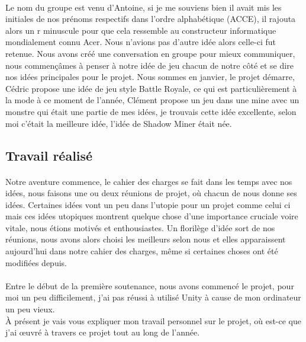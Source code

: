 \documentclass[titlepage, 13px, a4paper]{report}
\begin{document}
\paragraph{} \hspace{0pt}
Le nom du groupe est venu d'Antoine, si je me souviens bien il avait mis les initiales de nos 
prénoms respectifs dans l’ordre alphabétique (ACCE), il rajouta alors un r minuscule pour 
que cela ressemble au constructeur informatique mondialement connu Acer. Nous n’avions pas 
d’autre idée alors celle-ci fut retenue. Nous avons créé une conversation en groupe pour 
mieux communiquer, nous commençâmes à penser à notre idée de jeu chacun de notre côté et 
se dire nos idées principales pour le projet. Nous sommes en janvier, le projet démarre, 
Cédric propose une idée de jeu style Battle Royale, ce qui est particulièrement à la mode 
à ce moment de l’année, Clément propose un jeu dans une mine avec un monstre qui était une 
partie de mes idées, je trouvais cette idée excellente, selon moi c’était la meilleure idée, 
l’idée de Shadow Miner était née. \\

\subsection{Travail réalisé}

\paragraph{} \hspace{0pt}
Notre aventure commence, le cahier des charges se fait dans les temps avec nos idées, nous faisons une 
ou deux réunions de projet, où chacun de nous donne ses idées. Certaines idées vont un peu dans l'utopie 
pour un projet comme celui ci mais ces idées utopiques montrent quelque chose d'une importance cruciale 
voire vitale, nous étions motivés et enthousiastes. Un florilège d'idée sort de nos réunions, nous avons 
alors choisi les meilleurs selon nous et elles apparaissent aujourd'hui dans notre cahier des charges, 
même si certaines choses ont été modifiées depuis.  \\


\paragraph{} \hspace{0pt}
Entre le début de la première soutenance, nous avons commencé le projet, pour moi un peu difficilement, 
j'ai pas réussi à utilisé Unity à cause de mon ordinateur un peu vieux. \\
À présent je vais vous expliquer mon travail 
personnel sur le projet, où est-ce que j’ai œuvré à travers ce projet tout au long de l’année. \\
\end{document}
